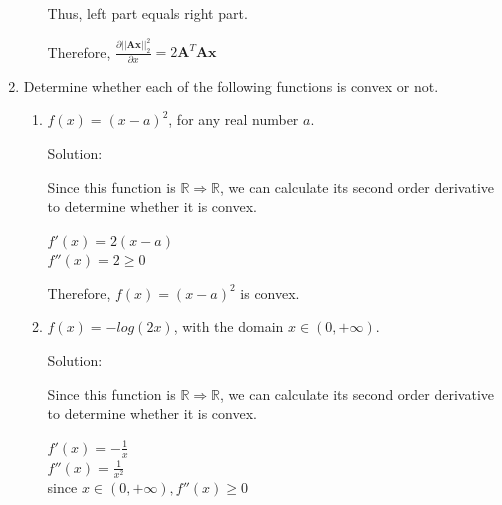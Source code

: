 \documentclass[12pt]{article}
\newcommand{\solu}{{\color{blue} Solution:}}
\begin{document}
\begin{enumerate}
\begin{enumerate}
            
            Thus, left part equals right part.

            Therefore, $\frac{\partial ||\pmb{Ax}||^2_2}{\partial x} = 2\pmb{A}^T \pmb{A}\pmb{x}$
          \end{enumerate}

          \item Determine whether each of the following functions is convex or not.
          \begin{enumerate}
            \item $f(x) = (x-a)^2$, for any real number $a$.
              
            \solu

            Since this function is $\mathbb{R} \Rightarrow \mathbb{R}$, we can calculate its second order derivative to determine whether it is convex.

            $f'(x) = 2(x - a)$ \\
            $f''(x) = 2 \ge 0$

            Therefore, $f(x) = (x-a)^2$ is convex.

            \item $f(x) = -log(2x)$, with the domain $x \in (0,+\infty)$.
              
            \solu

            Since this function is $\mathbb{R} \Rightarrow \mathbb{R}$, we can calculate its second order derivative to determine whether it is convex.

            $f'(x) = -\frac{1}{x}$\\
            $f''(x) = \frac{1}{x^2}$\\
            since $x \in (0, +\infty),  f''(x) \ge 0$


\end{enumerate}
\end{enumerate}
\end{document}
